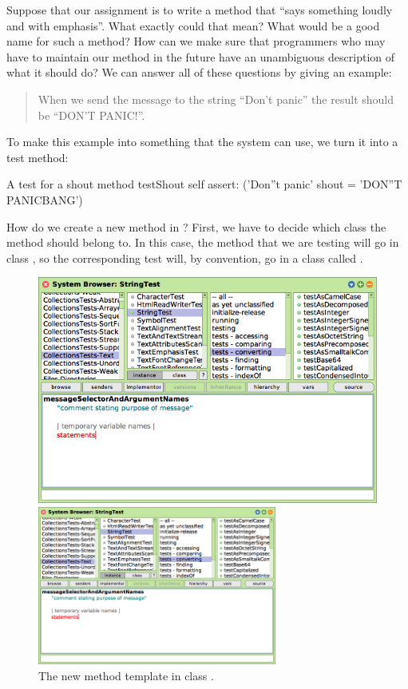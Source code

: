 \documentclass[a4paper,10pt,twoside]{book}
\begin{document}
Suppose that our assignment is to write a method that ``says something loudly and with emphasis''.  What exactly could that mean?  What would be a good name for such a method?  How can we make sure  that programmers who may have to maintain our method in the future have an unambiguous description of what it should do?   We can answer all of these questions by giving an example:

\begin{quote}
When we send the message  to the string ``Don't panic'' the result should be ``DON'T PANIC!''.
\end{quote}

\noindent
To make this example into something that the system can use, we turn it into a test method:

\begin{method}[testShout]{A test for a shout method}
testShout
	self assert: ('Don''t panic' shout = 'DON''T PANICBANG')
\end{method} %

How do we create a new method in \sq?   First, we have to decide which class the method should belong to.
In this case, the  method that we are testing will go in class , so the corresponding test will, by convention, go in a class called .

\begin{figure}[hbt]
\ifluluelse
	{\centerline {\includegraphics[width=\textwidth]{StringTest-newMethodTemplate}}}
	{\centerline {\includegraphics[width=0.7\textwidth]{StringTest-newMethodTemplate}}}
\caption{The new method template in class .
\label{fig:newMethodTemplate}}
\end{figure}
\end{document}
